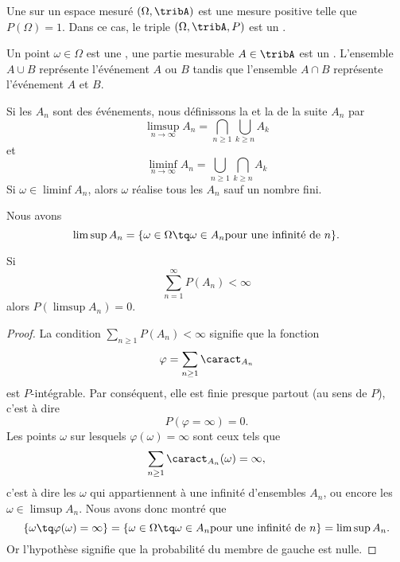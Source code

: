Une  sur un espace mesuré \( (\Omega,\tribA)\) est une mesure positive telle que \( P(\Omega)=1\). Dans ce cas, le triple \( (\Omega,\tribA,P)\) est un .

Un point \( \omega\in\Omega\) est une , une partie mesurable \( A\in\tribA\) est un . L'ensemble \( A\cup B\) représente l'événement \( A\) ou \( B\) tandis que l'ensemble \( A\cap B\) représente l'événement \( A\) et \( B\).


Si les \( A_n\) sont des événements, nous définissons la  et la  de la suite \( A_n\) par
\begin{equation}
    \limsup_{n\to\infty}A_n=\bigcap_{n\geq 1}\bigcup_{k\geq n}A_k
\end{equation}
et
\begin{equation}
    \liminf_{n\to\infty}A_n=\bigcup_{n\geq 1}\bigcap_{k\geq n}A_k
\end{equation}
Si \( \omega\in\liminf A_n\), alors \( \omega\) réalise tous les \( A_n\) sauf un nombre fini.

Nous avons
\begin{equation}
    \limsup A_n=\{ \omega\in\Omega\tq \omega\in A_n\text{pour une infinité de \( n\)} \}.
\end{equation}

\begin{theorem}
    Si
    \begin{equation}
        \sum_{n=1}^{\infty}P(A_n)<\infty
    \end{equation}
    alors \( P(\limsup A_n)=0\).
\end{theorem}

\begin{proof}
    La condition \( \sum_{n\geq 1}P(A_n)<\infty\) signifie que la fonction
    \begin{equation}
        \varphi=\sum_{n\geq 1}\caract_{A_n}
    \end{equation}
    est \( P\)-intégrable. Par conséquent, elle est finie presque partout (au sens de \( P\)), c'est à dire
    \begin{equation}
        P(\varphi=\infty)=0.
    \end{equation}
    Les points \( \omega\) sur lesquels \( \varphi(\omega)=\infty\) sont ceux tels que
    \begin{equation}
        \sum_{n\geq 1}\caract_{A_n}(\omega)=\infty,
    \end{equation}
    c'est à dire les \( \omega\) qui appartiennent à une infinité d'ensembles \( A_n\), ou encore les \( \omega\in\limsup A_n\). Nous avons donc montré que
    \begin{equation}
        \{ \omega\tq \varphi(\omega)=\infty \}=\{ \omega\in\Omega\tq \omega\in A_n\text{pour une infinité de \( n\)} \}=\limsup A_n.
    \end{equation}
    Or l'hypothèse signifie que la probabilité du membre de gauche est nulle.
\end{proof}

